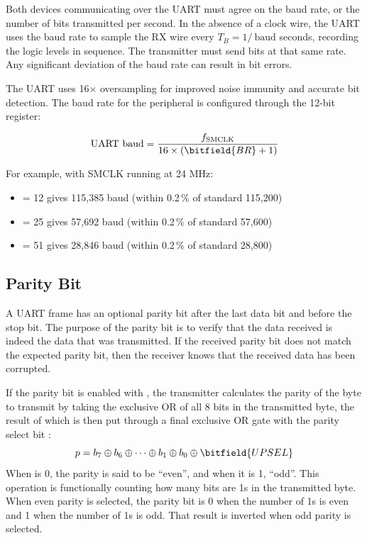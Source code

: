 Both devices communicating over the UART must agree on the baud rate, or the number of bits transmitted per second. In the absence of a clock wire, the UART uses the baud rate to sample the RX wire every $T_B = 1/\ \textrm{baud}$ seconds, recording the logic levels in sequence. The transmitter must send bits at that same rate. Any significant deviation of the baud rate can result in bit errors.

The UART uses 16× oversampling for improved noise immunity and accurate bit detection. The baud rate for the  peripheral is configured through the 12-bit  register:

\begin{equation*}
	\textrm{UART baud} = \frac{f_\textrm{SMCLK}}{16 \times (\bitfield{BR} + 1)}
\end{equation*}

For example, with SMCLK running at 24 MHz:
\begin{itemize}
	\item {} = 12 gives 115,385 baud (within 0.2\,\% of standard 115,200)
	\item {} = 25 gives 57,692 baud (within 0.2\,\% of standard 57,600)
	\item {} = 51 gives 28,846 baud (within 0.2\,\% of standard 28,800)
\end{itemize}



\subsection{Parity Bit}

A UART frame has an optional parity bit after the last data bit and before the stop bit. The purpose of the parity bit is to verify that the data received is indeed the data that was transmitted. If the received parity bit does not match the expected parity bit, then the receiver knows that the received data has been corrupted.

If the parity bit is enabled with , the transmitter calculates the parity of the byte to transmit by taking the exclusive OR of all 8 bits in the transmitted byte, the result of which is then put through a final exclusive OR gate with the parity select bit :
\begin{equation*}
p = b_7 \oplus b_6 \oplus \cdots \oplus b_1 \oplus b_0 \oplus \bitfield{UPSEL}
\end{equation*}
When  is 0, the parity is said to be ``even'', and when it is 1, ``odd''. This operation is functionally counting how many bits are 1s in the transmitted byte. When even parity is selected, the parity bit is 0 when the number of 1s is even and 1 when the number of 1s is odd. That result is inverted when odd parity is selected.

